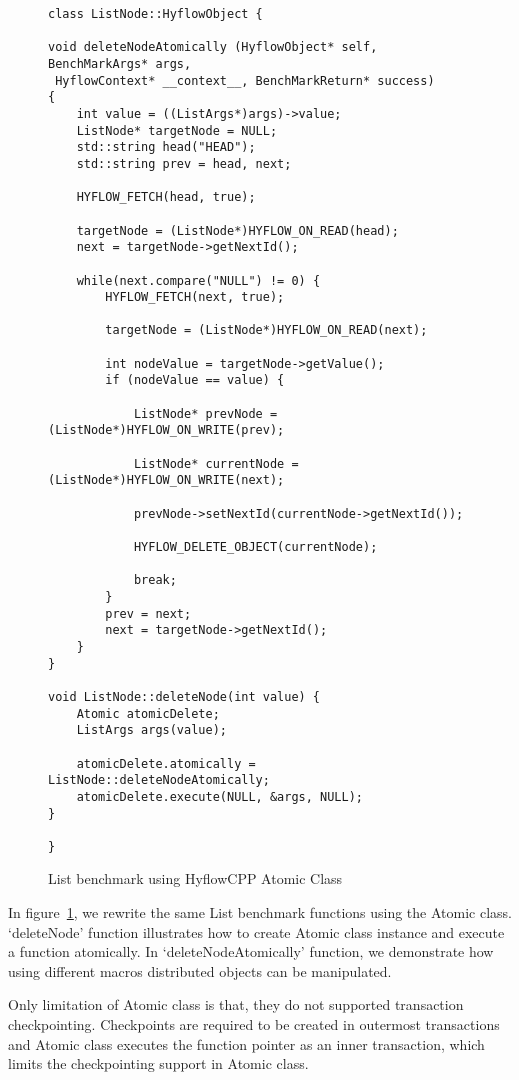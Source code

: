\documentclass[12pt,english]{report}
\begin{document}
\begin{figure}
\centering
\begin{lstlisting}
class ListNode::HyflowObject {

void deleteNodeAtomically (HyflowObject* self, BenchMarkArgs* args,
 HyflowContext* __context__, BenchMarkReturn* success) 
{
	int value = ((ListArgs*)args)->value;
	ListNode* targetNode = NULL;
	std::string head("HEAD");
	std::string prev = head, next;

	HYFLOW_FETCH(head, true);
	
	targetNode = (ListNode*)HYFLOW_ON_READ(head);
	next = targetNode->getNextId();

	while(next.compare("NULL") != 0) {
		HYFLOW_FETCH(next, true);
		
		targetNode = (ListNode*)HYFLOW_ON_READ(next);
		
		int nodeValue = targetNode->getValue();
		if (nodeValue == value) {
		
			ListNode* prevNode = (ListNode*)HYFLOW_ON_WRITE(prev);
			
			ListNode* currentNode = (ListNode*)HYFLOW_ON_WRITE(next);
			
			prevNode->setNextId(currentNode->getNextId());
			
			HYFLOW_DELETE_OBJECT(currentNode);
			
			break;
		}
		prev = next;
		next = targetNode->getNextId();
	}
}

void ListNode::deleteNode(int value) {
	Atomic atomicDelete;	
	ListArgs args(value);
	
	atomicDelete.atomically = ListNode::deleteNodeAtomically;
	atomicDelete.execute(NULL, &args, NULL);
}

}
\end{lstlisting}
\caption{List benchmark using HyflowCPP Atomic Class}
\label{Fig:listClassDelete}
\end{figure}

In figure~\ref{Fig:listClassDelete}, we rewrite the same List benchmark functions using the Atomic class. `deleteNode' function illustrates how to create Atomic class instance and execute a function atomically. In `deleteNodeAtomically' function, we demonstrate how using different macros distributed objects can be manipulated.

Only limitation of Atomic class is that, they do not supported transaction checkpointing. Checkpoints are required to be created in outermost transactions and Atomic class executes the function pointer as an inner transaction, which limits the checkpointing support in Atomic class. 
\end{document}
